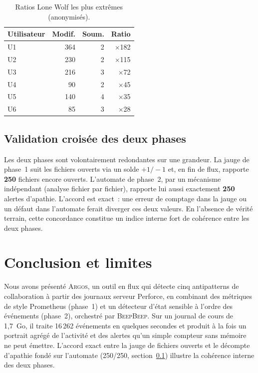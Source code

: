 \documentclass[conference]{IEEEtran}
\newcommand{\toolname}{\textsc{Argos}}
\newcommand{\beepbeep}{\textsc{BeepBeep}}
\begin{document}
\begin{table}[!t]
  \caption{Ratios Lone Wolf les plus extrêmes (anonymisés).}
  \label{tab:lonewolf}
  \centering
  \scriptsize
  \begin{tabularx}{\linewidth}{@{}Xrrr@{}}
    \toprule
    \textbf{Utilisateur} & \textbf{Modif.} & \textbf{Soum.} & \textbf{Ratio} \\
    \midrule
    U1 & 364 & 2 & $\times$182 \\
    U2 & 230 & 2 & $\times$115 \\
    U3 & 216 & 3 & $\times$72 \\
    U4 & 90 & 2 & $\times$45 \\
    U5 & 140 & 4 & $\times$35 \\
    U6 & 85 & 3 & $\times$28 \\
    \bottomrule
  \end{tabularx}
\end{table}

\subsection{Validation croisée des deux phases}
\label{sec:validation_croisee}
Les deux phases sont volontairement redondantes sur une grandeur.
La jauge de phase~1 suit les fichiers ouverts via un solde $+1/-1$ et,
en fin de flux, rapporte \textbf{250} fichiers encore ouverts.
L'automate de phase~2, par un mécanisme indépendant (analyse fichier par
fichier), rapporte lui aussi exactement \textbf{250} alertes d'apathie.
L'accord est exact~: une erreur de comptage dans la jauge ou un défaut
dans l'automate ferait diverger ces deux valeurs. En l'absence de vérité
terrain, cette concordance constitue un indice interne fort de cohérence
entre les deux phases.

\section{Conclusion et limites}
\label{sec:conclu}

Nous avons présenté \toolname{}, un outil en flux qui détecte cinq
antipatterns de collaboration à partir des journaux serveur Perforce, en
combinant des métriques de style Prometheus (phase~1) et un détecteur
d'état sensible à l'ordre des événements (phase~2), orchestré par
\beepbeep{}. Sur un journal de cours de 1,7~Go, il traite
16\,262 événements en quelques secondes et produit à la fois un portrait
agrégé de l'activité et des alertes qu'un simple compteur sans mémoire
ne peut émettre. L'accord exact entre la jauge de fichiers ouverts et le
décompte d'apathie fondé sur l'automate (250/250,
section~\ref{sec:validation_croisee}) illustre la cohérence interne des
deux phases.
\end{document}
